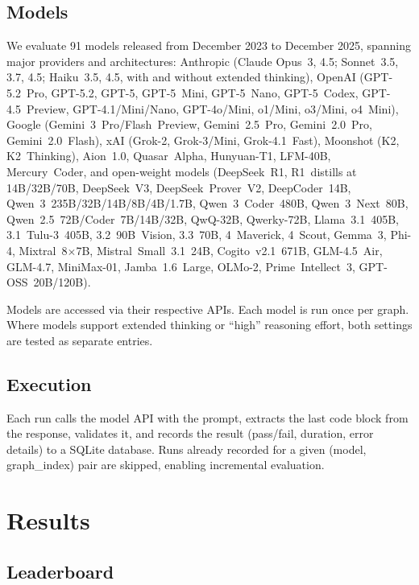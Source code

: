 \documentclass{article}
\begin{document}
\subsection{Models}

We evaluate 91 models released from December 2023 to December 2025, spanning major providers and architectures: Anthropic (Claude Opus~3, 4.5; Sonnet~3.5, 3.7, 4.5; Haiku~3.5, 4.5, with and without extended thinking), OpenAI (GPT-5.2~Pro, GPT-5.2, GPT-5, GPT-5~Mini, GPT-5~Nano, GPT-5~Codex, GPT-4.5~Preview, GPT-4.1/Mini/Nano, GPT-4o/Mini, o1/Mini, o3/Mini, o4~Mini), Google (Gemini~3~Pro/Flash~Preview, Gemini~2.5~Pro, Gemini~2.0~Pro, Gemini~2.0~Flash), xAI (Grok-2, Grok-3/Mini, Grok-4.1~Fast), Moonshot (K2, K2~Thinking), Aion~1.0, Quasar~Alpha, Hunyuan-T1, LFM-40B, Mercury~Coder, and open-weight models (DeepSeek~R1, R1~distills at 14B/32B/70B, DeepSeek~V3, DeepSeek~Prover~V2, DeepCoder~14B, Qwen~3~235B/32B/14B/8B/4B/1.7B, Qwen~3~Coder~480B, Qwen~3~Next~80B, Qwen~2.5~72B/Coder~7B/14B/32B, QwQ-32B, Qwerky-72B, Llama~3.1~405B, 3.1~Tulu-3~405B, 3.2~90B~Vision, 3.3~70B, 4~Maverick, 4~Scout, Gemma~3, Phi-4, Mixtral~8$\times$7B, Mistral~Small~3.1~24B, Cogito~v2.1~671B, GLM-4.5~Air, GLM-4.7, MiniMax-01, Jamba~1.6~Large, OLMo-2, Prime~Intellect~3, GPT-OSS~20B/120B).

Models are accessed via their respective APIs. Each model is run once per graph. Where models support extended thinking or ``high'' reasoning effort, both settings are tested as separate entries.

\subsection{Execution}

Each run calls the model API with the prompt, extracts the last code block from the response, validates it, and records the result (pass/fail, duration, error details) to a SQLite database. Runs already recorded for a given (model, graph\_index) pair are skipped, enabling incremental evaluation.

\newpage
\section{Results}

\subsection{Leaderboard}
\end{document}

